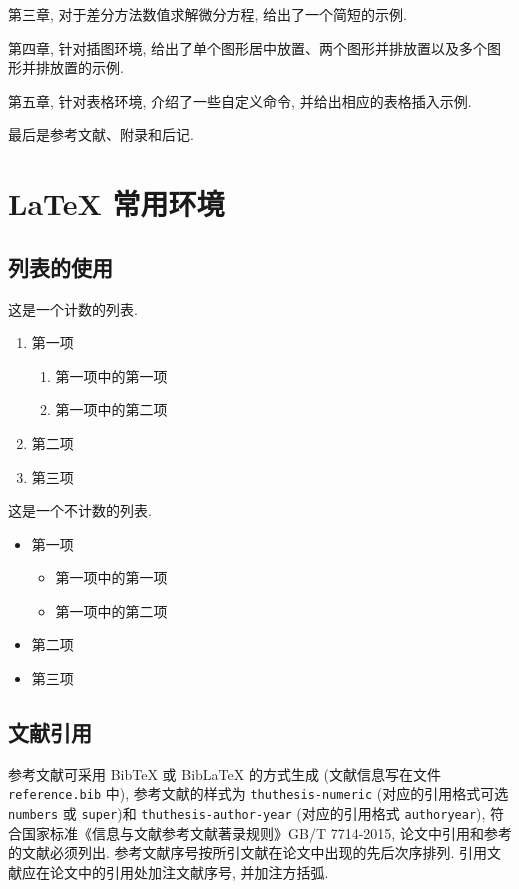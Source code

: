 \documentclass[openany,twoside,12pt]{book}
\theoremstyle{plain}
\begin{document}
第三章, 对于差分方法数值求解微分方程, 给出了一个简短的示例.

第四章, 针对插图环境, 给出了单个图形居中放置、两个图形并排放置以及多个图形并排放置的示例.

第五章, 针对表格环境, 介绍了一些自定义命令, 并给出相应的表格插入示例.

最后是参考文献、附录和后记.




\chapter{LaTeX 常用环境}

\section{列表的使用}

这是一个计数的列表.
\begin{enumerate}%
  \item 第一项
    \begin{enumerate}
      \item 第一项中的第一项
      \item 第一项中的第二项
    \end{enumerate}
  \item 第二项
  \item 第三项
\end{enumerate}

这是一个不计数的列表.
\begin{itemize}%
  \item 第一项
  \begin{itemize}
    \item 第一项中的第一项
    \item 第一项中的第二项
  \end{itemize}
  \item 第二项
  \item 第三项
\end{itemize}


\section{文献引用}

参考文献可采用 BibTeX 或 BibLaTeX 的方式生成 (文献信息写在文件 \verb|reference.bib| 中), 参考文献的样式为 \verb|thuthesis-numeric| (对应的引用格式可选 \verb|numbers| 或  \verb|super|)和 \verb|thuthesis-author-year| (对应的引用格式 \verb|authoryear|), 符合国家标准《信息与文献参考文献著录规则》GB/T 7714-2015, 论文中引用和参考的文献必须列出. 参考文献序号按所引文献在论文中出现的先后次序排列. 引用文献应在论文中的引用处加注文献序号, 并加注方括弧.
\end{document}
